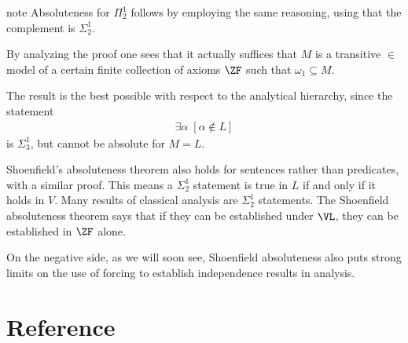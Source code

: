 \documentclass[letterpaper,10pt,english]{jupyterBook}
\begin{document}
\begin{sphinxadmonition}{note}
\sphinxAtStartPar
Absoluteness for \(\Pi^1_2\) follows by employing the same reasoning, using that the complement is \(\Sigma^1_2\).
\end{sphinxadmonition}

\sphinxAtStartPar
By analyzing the proof one sees that it actually suffices that \(M\) is a transitive \(\in\)\sphinxhyphen{}model of a certain finite collection of axioms \(\ZF\) such that \(\omega_1 \subseteq M\).

\sphinxAtStartPar
The result is the best possible with respect to the analytical hierarchy, since the statement
\begin{equation*}
\begin{split}
	\exists \alpha \; [\alpha \not\in L]
\end{split}
\end{equation*}
\sphinxAtStartPar
is \(\Sigma^1_3\), but cannot be absolute for \(M = L\).

\sphinxAtStartPar
Shoenfield’s absoluteness theorem also holds for sentences rather than predicates, with a similar proof. This means a \(\Sigma^1_2\) statement is true in \(L\) if and only if it holds in \(V\). Many results of classical analysis are \(\Sigma^1_2\) statements. The Shoenfield absoluteness theorem says that if they can be established under \(\VL\), they can be established in \(\ZF\) alone.

\sphinxAtStartPar
On the negative side, as we will soon see, Shoenfield absoluteness also puts strong limits on the use of forcing to establish independence results in analysis.

\sphinxstepscope


\part{Reference}

\sphinxstepscope
\end{document}
